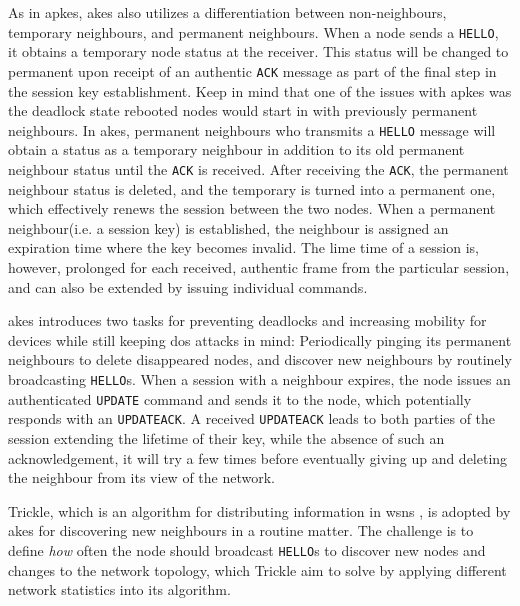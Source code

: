 As in \gls{apkes}, \gls{akes} also utilizes a differentiation between non-neighbours, temporary neighbours, and permanent neighbours. When a node sends a \texttt{HELLO}, it obtains a temporary node status at the receiver. This status will be changed to permanent upon receipt of an authentic \texttt{ACK} message as part of the final step in the session key establishment. Keep in mind that one of the issues with \gls{apkes} was the deadlock state rebooted nodes would start in with previously permanent neighbours. In \gls{akes}, permanent neighbours who transmits a \texttt{HELLO} message will obtain a status as a temporary neighbour in addition to its old permanent neighbour status until the \texttt{ACK} is received. After receiving the \texttt{ACK}, the permanent neighbour status is deleted, and the temporary is turned into a permanent one, which effectively renews the session between the two nodes. When a permanent neighbour(i.e. a session key) is established, the neighbour is assigned an expiration time where the key becomes invalid. The lime time of a session is, however, prolonged for each received, authentic frame from the particular session, and can also be extended by issuing individual commands. 

\gls{akes} introduces two tasks for preventing deadlocks and increasing mobility for devices while still keeping \gls{dos} attacks in mind: Periodically pinging its permanent neighbours to delete disappeared nodes, and discover new neighbours by routinely broadcasting \texttt{HELLO}s. When a session with a neighbour expires, the node issues an authenticated \texttt{UPDATE} command and sends it to the node, which potentially responds with an \texttt{UPDATEACK}. A received \texttt{UPDATEACK} leads to both parties of the session extending the lifetime of their key, while the absence of such an acknowledgement, it will try a few times before eventually giving up and deleting the neighbour from its view of the network.

Trickle, which is an algorithm for distributing information in \gls{wsn}s \cite{levis2011trickle}, is adopted by \gls{akes} for discovering new neighbours in a routine matter. The challenge is to define \emph{how} often the node should broadcast \texttt{HELLO}s to discover new nodes and changes to the network topology, which Trickle aim to solve by applying different network statistics into its algorithm.

